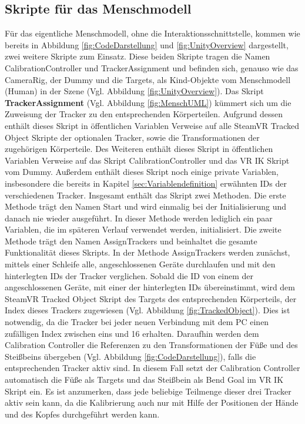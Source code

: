 \subsection{Skripte für das Menschmodell}\label{sec:MMCode}
Für das eigentliche Menschmodell, ohne die Interaktionsschnittstelle, kommen wie bereits in Abbildung \ref{fig:CodeDarstellung}  und \ref{fig:UnityOverview} dargestellt, zwei weitere Skripte zum Einsatz. Diese beiden Skripte tragen die Namen CalibrationController und TrackerAssignment und befinden sich, genauso wie das CameraRig, der Dummy und die Targets, als Kind-Objekte vom Menschmodell (Human) in der Szene (Vgl. Abbildung \ref{fig:UnityOverview}).
\newline\newline
Das Skript \textbf{TrackerAssignment} (Vgl. Abbildung \ref{fig:MenschUML}) kümmert sich um die Zuweisung der Tracker zu den entsprechenden Körperteilen. Aufgrund dessen enthält dieses Skript in öffentlichen Variablen Verweise auf alle SteamVR Tracked Object Skripte der optionalen Tracker, sowie die Transformationen der zugehörigen Körperteile. Des Weiteren enthält dieses Skript in öffentlichen Variablen Verweise auf das Skript CalibrationController und das VR IK Skript vom Dummy. Außerdem enthält dieses Skript noch einige private Variablen, insbesondere die bereits in Kapitel \ref{sec:Variablendefinition} erwähnten IDs der verschiedenen Tracker.
\newline
Insgesamt enthält das Skript zwei Methoden. Die erste Methode trägt den Namen Start und wird einmalig bei der Initialisierung und danach nie wieder ausgeführt. In dieser Methode werden lediglich ein paar Variablen, die im späteren Verlauf verwendet werden, initialisiert. Die zweite Methode trägt den Namen AssignTrackers und beinhaltet die gesamte Funktionalität dieses Skripts.
In der Methode AssignTrackers werden zunächst, mittels einer Schleife alle, angeschlossenen Geräte durchlaufen und mit den hinterlegten IDs der Tracker verglichen. Sobald die ID von einem der angeschlossenen Geräte, mit einer der hinterlegten IDs übereinstimmt, wird dem SteamVR Tracked Object Skript des Targets des entsprechenden Körperteils, der Index dieses Trackers zugewiesen (Vgl. Abbildung \ref{fig:TrackedObject}). Dies ist notwendig, da die Tracker bei jeder neuen Verbindung mit dem PC einen zufälligen Index zwischen eins und 16 erhalten.
Daraufhin werden dem Calibration Controller die Referenzen zu den Transformationen der Füße und des Steißbeins übergeben (Vgl. Abbildung \ref{fig:CodeDarstellung}), falls die entsprechenden Tracker aktiv sind. In diesem Fall setzt der Calibration Controller automatisch die Füße als Targets und das Steißbein als Bend Goal im VR IK Skript ein. Es ist anzumerken, dass jede beliebige Teilmenge dieser drei Tracker aktiv sein kann, da die Kalibrierung auch nur mit Hilfe der Positionen der Hände und des Kopfes durchgeführt werden kann.
